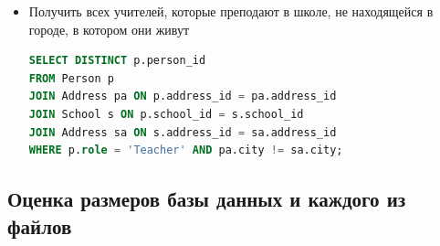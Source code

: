 \documentclass[a4paper]{article}
\begin{document}
\begin{itemize}
      \item Получить всех учителей, которые преподают в школе, не находящейся в городе, в котором они живут
            \begin{lstlisting}[language=SQL, label={lst:sql-example}, frame=none, numbers=none]
SELECT DISTINCT p.person_id
FROM Person p
JOIN Address pa ON p.address_id = pa.address_id
JOIN School s ON p.school_id = s.school_id
JOIN Address sa ON s.address_id = sa.address_id
WHERE p.role = 'Teacher' AND pa.city != sa.city;
\end{lstlisting}
\end{itemize}

\subsection{Оценка размеров базы данных и каждого из файлов}
\end{document}

